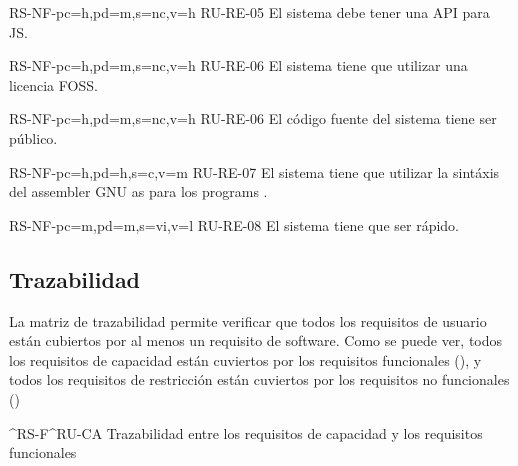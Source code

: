 \begin{softwareReq}{RS-NF-}{pc=h,pd=m,s=nc,v=h}
    {RU-RE-05}
    El sistema debe tener una \gls{API} para \gls{JS}.
\end{softwareReq}

\begin{softwareReq}{RS-NF-}{pc=h,pd=m,s=nc,v=h}
    {RU-RE-06}
    El sistema tiene que utilizar una licencia \gls{FOSS}.
\end{softwareReq}

\begin{softwareReq}{RS-NF-}{pc=h,pd=m,s=nc,v=h}
    {RU-RE-06}
    El código fuente del sistema tiene ser público.
\end{softwareReq}

\begin{softwareReq}{RS-NF-}{pc=h,pd=h,s=c,v=m}
    {RU-RE-07}
    El sistema tiene que utilizar la sintáxis del \gls{assembler} GNU as para
    los \glspl{program} .
\end{softwareReq}

\begin{softwareReq}{RS-NF-}{pc=m,pd=m,s=vi,v=l}
    {RU-RE-08}
    El sistema tiene que ser rápido. %
\end{softwareReq}

\FloatBarrier


\subsection{Trazabilidad}\label{subsec:trazability}

La matriz de trazabilidad permite verificar que todos los requisitos de usuario
están cubiertos por al menos un requisito de software. Como se puede ver, todos
los requisitos de capacidad están cuviertos por los requisitos funcionales
(), y todos los requisitos de restricción están
cuviertos por los requisitos no funcionales ()

    {^RS-F}{^RU-CA}
    {Trazabilidad entre los requisitos de capacidad y los requisitos funcionales}

